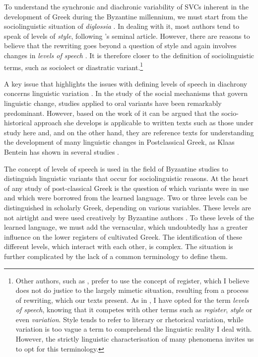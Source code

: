 \documentclass[output=paper,colorlinks,citecolor=brown]{langscibook}
\begin{document}
To understand the synchronic and diachronic variability of SVCs inherent in the
development of Greek during the Byzantine millennium, we must start from the
sociolinguistic situation of \emph{diglossia} \parencite{ToufexisN-2008293}. In dealing
with it, most authors tend to speak of levels of \emph{style}, following
\citet{SevcenkoIgor-1981832}'s seminal article. However, there are reasons to believe that
the rewriting goes beyond a question of style and again involves changes in \emph{levels
  of speech} \parencites{HinterbergerMartin-2010837,HinterbergerMartin-202164}. It is
therefore closer to the definition of sociolinguistic terms, such as sociolect or
diastratic variant.\footnote{Other authors, such as \citet{MarkopoulosTheodore-2009295},
  prefer to use the concept of register, which I believe does not do justice to the
  largely mimetic situation, resulting from a process of rewriting, which our texts
  present. As in \citet{VivesCuestaAlfonsoandMadrigalAceroLucía-2022404}, I have opted for
  the term \emph{levels of speech}, knowing that it competes with other terms such as
  \emph{register}, \emph{style} or even \emph{variation}. Style tends to refer to literary
  or rhetorical variation, while variation is too vague a term to comprehend the
  linguistic reality I deal with. However, the strictly linguistic characterisation
  of many phenomena invites us to opt for this terminology.}

A key issue that highlights the issues with defining levels of speech in diachrony
concerns linguistic variation \parencite{BenteinKlaas-2017395}. In the study of the social
mechanisms that govern linguistic change, studies applied to oral variants have been
remarkably predominant. However, based on the work of \citet[122]{RomaineSuzanne-1982785}
it can be argued that the socio-historical approach she develops is applicable to written
texts such as those under study here and, and on the other hand, they are reference texts for
understanding the development of many linguistic changes in Postclassical Greek, as Klaas
Bentein has shown in several studies
\parencites{BenteinKlaas-2017395,BenteinKlaas-201979,BenteinKlaas-2020124}.

The concept of levels of speech is used in the field of Byzantine studies to distinguish
linguistic variants that occur for sociolinguistic reasons. At the heart of any study of
post-classical Greek is the question of which variants were in use and which were borrowed
from the learned language. Two or three levels can be distinguished in scholarly Greek,
depending on various variables. These levels are not airtight and were used creatively by
Byzantine authors \parencite{HinterbergerMartin-2014130}. To these levels of the learned
language, we must add the vernacular, which undoubtedly has a greater influence on the
lower registers of cultivated Greek. The identification of these different levels, which
interact with each other, is complex. The situation is further complicated by the lack of
a common terminology to define them.
\end{document}
